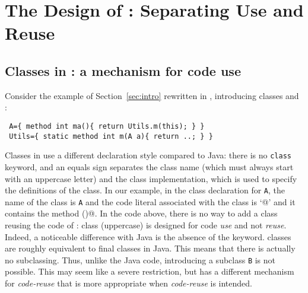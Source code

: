 \saveSpace
\section{The Design of \name: Separating Use and Reuse}\label{sec:separate}

\subsection{Classes in \name: a mechanism for code use}
\saveSpace
Consider the example of Section~\ref{sec:intro} rewritten in \name, introducing classes \Q@Utils@ and \Q@A@:
\saveSpace\saveSpace
\begin{lstlisting}
 A={ method int ma(){ return Utils.m(this); } }
 Utils={ static method int m(A a){ return ..; } }
\end{lstlisting} 
\saveSpace\saveSpace
\noindent Classes in \name use a different declaration style compared
to Java: there is no \lstinline{class} keyword, and an equals sign separates the class name (which must always start with
an uppercase letter) and the class implementation, which is used to specify the
definitions of the class. In our example, in the class declaration
for \lstinline{A}, the name of the class is \lstinline{A} and the code 
literal associated with the class is `@' and it contains the method \Q@ma()@.
In the \name code above, there is no way to add a class 
\Q@B@ reusing the code of \Q@A@: class \Q@A@ (uppercase) is designed for code \emph{use} and not \emph{reuse}.
Indeed, a noticeable difference with Java is the
absence of the \Q@extends@ keyword.
\name classes are roughly equivalent to final classes in Java. This means that there is actually no subclassing.
Thus, unlike the Java code, introducing a subclass
\lstinline{B} is not possible. This may seem like a severe restriction, but
\name has a different mechanism for \emph{code-reuse} that 
is more appropriate when \emph{code-reuse} is intended. 

